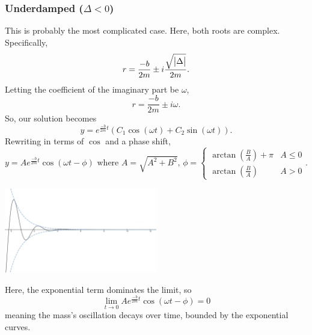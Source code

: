 \subsubsection{Underdamped ($\Delta < 0$)}
This is probably the most complicated case.
Here, both roots are complex.
Specifically,
\begin{equation*}
	r = \frac{-b}{2m} \pm i\frac{\sqrt{\big\lvert \Delta \big\rvert}}{2m}.
\end{equation*}
Letting the coefficient of the imaginary part be $\omega$,
\begin{equation*}
	r = \frac{-b}{2m} \pm i\omega.
\end{equation*}
So, our solution becomes
\begin{equation*}
	y = e^{\frac{-b}{2m} t}\left(C_1\cos{(\omega t)} + C_2\sin{(\omega t)}\right).
\end{equation*}
Rewriting in terms of $\cos$ and a phase shift,
\begin{equation*}
	y = Ae^{\frac{-b}{2m} t}\cos{(\omega t - \phi)} \text{ where }
	A = \sqrt{A^2 + B^2} \text{, } \phi = \begin{cases}
		\arctan{\left(\frac{B}{A}\right)} + \pi & A \leq 0 \\
		\arctan{\left(\frac{B}{A}\right)} & A > 0
	\end{cases}.
\end{equation*}
\begin{center}
	\includegraphics[width=0.5\textwidth]{./higherOrder/freeVibrs/underdamped.png}
\end{center}
Here, the exponential term dominates the limit, so
\begin{equation*}
	\lim\limits_{t \to 0}{Ae^{\frac{-b}{2m}t}\cos{(\omega t - \phi)}} = 0
\end{equation*}
meaning the mass's oscillation decays over time, bounded by the exponential curves. 